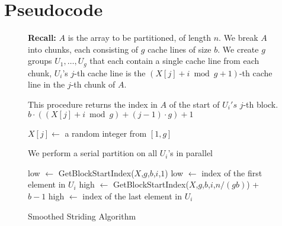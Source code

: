 \documentclass[11pt]{article}
\theoremstyle{remark}
\theoremstyle{remark}
\begin{document}



\section{Pseudocode}\label{sec:pseudocode}

\begin{figure*}[h]
  \scriptsize
  \caption{Smoothed Striding Algorithm}
	\label{alg:parallelPartition_smoothedStriding}
	\begin{algorithmic}%
    \State \textbf{Recall:} 
    \State $A$ is the array to be partitioned, of length $n$. 
    \State We break $A$ into chunks, each consisting of $g$ cache lines of size $b$.
    \State We create $g$ groups $U_1,\ldots, U_g$ that each contain a single cache line from each chunk,
    \State $U_i$'s $j$-th cache line is the $(X[j]+i \bmod g + 1)$-th cache line in the $j$-th chunk of $A$.
    \State

      \Comment This procedure returns the index in $A$ of the start of $U_i's$ $j$-th block.
      \State\Return $b\cdot ((X[j] + i \bmod g) +(j-1)\cdot g)+1$
    \EndProcedure
    \State

        \State $X[j] \gets$ a random integer from $[1,g]$ 
      \EndFor

       \Comment We perform a serial partition on all $U_i$'s in parallel

        \State low $\gets$ GetBlockStartIndex($X$,$g$,$b$,$i$,$1$)
        \Comment low $\gets$ index of the first element in $U_i$
        \State high $\gets$ GetBlockStartIndex($X$,$g$,$b$,$i$,$n/(gb)$) + $b-1$
        \Comment high $\gets$ index of the last element in $U_i$


\end{algorithmic}
\end{figure*}
\end{document}
